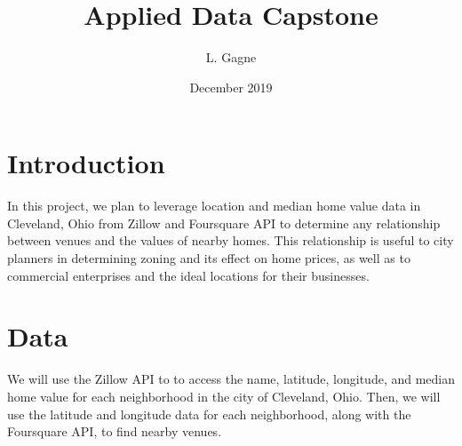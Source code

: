 \documentclass[twoside,12pt]{report}
\title{Applied Data Capstone}
\author{L. Gagne}
\date{December 2019}
\begin{document}
\maketitle

\chapter*{Introduction}


In this project, we plan to leverage location and median home value data in Cleveland, Ohio from Zillow and Foursquare API to determine any relationship between venues and the values of nearby homes.  This relationship is useful to city planners in determining zoning and its effect on home prices, as well as to commercial enterprises and the ideal locations for their businesses.

\chapter*{Data}

We will use the Zillow API to to access the name, latitude, longitude, and median home value for each neighborhood in the city of Cleveland, Ohio.  Then, we will use the latitude and longitude data for each neighborhood, along with the Foursquare API, to find nearby venues.
\end{document}
